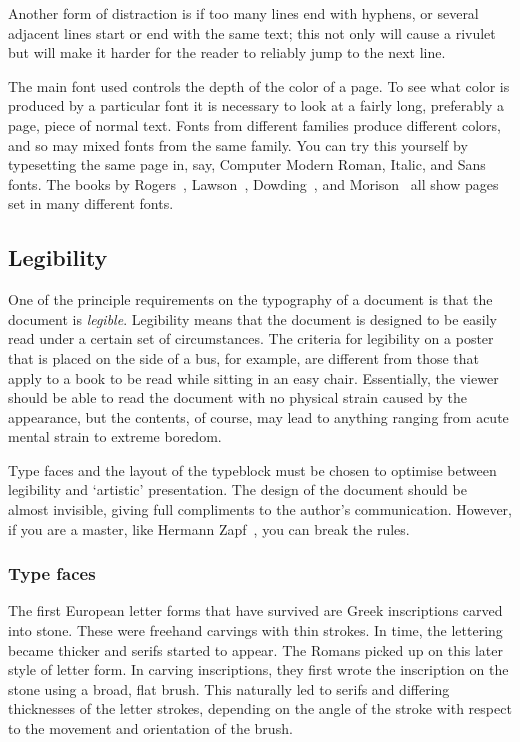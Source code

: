 \documentclass[10pt,letterpaper]{memoir}
\begin{document}
    Another form of distraction is if too many lines end with hyphens, or
several adjacent lines start or end with the same text; this not only
will cause a rivulet but will make it harder for the reader to reliably
jump to the next line.

    The main font used controls the depth of the color of a page. To
see what color is produced by a particular font it is necessary to look
at a fairly long, preferably a page, piece of normal text. Fonts from
different families produce different colors, and so may mixed fonts from 
the same family. You can try this yourself by typesetting the same page
in, say, Computer Modern Roman, Italic, and Sans fonts.
The books by Rogers~\cite{ROGERS43}, Lawson~\cite{LAWSON90},
Dowding~\cite{DOWDING98}, and 
Morison~\cite{MORISON99} all show pages set in many different fonts.

    

\subsection{Legibility}

    One of the principle requirements on the typography of a document is that
the document is \emph{legible}. Legibility means that the document is designed
to be easily read under a certain set of circumstances. The criteria for
legibility on a poster that is placed on the side of a bus, for example, are
different from those that apply to a book to be read while sitting in an
easy chair. Essentially, the viewer should be able to read the document
with no physical strain caused by the appearance, but the contents, of course,
may lead to anything ranging from acute mental strain to extreme boredom.

    Type faces and the layout of the typeblock must be chosen to optimise
between legibility and `artistic' presentation. The design of the document
should be almost invisible, giving full compliments to the author's
communication. However, if you are a master, like
Hermann Zapf~\cite{ZAPF00}, you can break the rules.

    

\subsubsection{Type faces}

    The first European letter forms that have survived are Greek inscriptions
carved into stone. These were freehand carvings with thin strokes. In time,
the lettering became thicker and serifs started to appear. The Romans
picked up on this later style of letter form. In carving inscriptions, they
first wrote the inscription on the stone using a broad, flat brush. This
naturally led to serifs and differing thicknesses of the letter strokes,
depending on the angle of the stroke with respect to the movement and
orientation of the brush.
\end{document}
